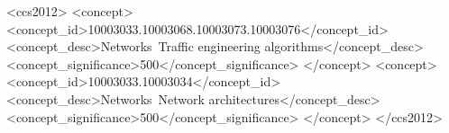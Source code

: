 \documentclass[sigconf,10pt]{acmart}
\def\drafttime{\ifnum \hour<13 \number\hour:%
                      \ifnum \minute<10 0\fi
                      \number\minute
                      \ifnum \hour<12 \ AM\else \ PM\fi
         \else \advance \hour by -12 \number\hour:%
                      \ifnum \minute<10 0\fi
                      \number\minute \ PM\fi}
\def\timestamp{\today \ \drafttime}
\begin{document}
\begin{CCSXML}
<ccs2012>
<concept>
<concept_id>10003033.10003068.10003073.10003076</concept_id>
<concept_desc>Networks~Traffic engineering algorithms</concept_desc>
<concept_significance>500</concept_significance>
</concept>
<concept>
<concept_id>10003033.10003034</concept_id>
<concept_desc>Networks~Network architectures</concept_desc>
<concept_significance>500</concept_significance>
</concept>
</ccs2012>
\end{CCSXML}





\maketitle











%
%

%
%






% 
\end{document}
